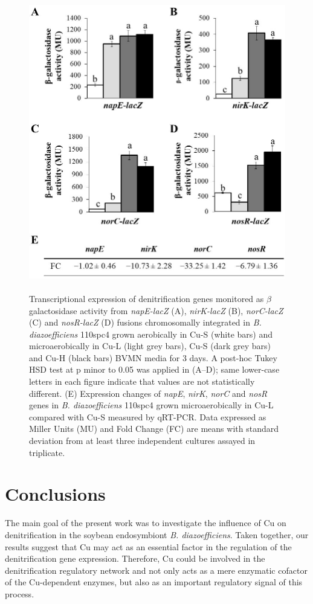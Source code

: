 \documentclass[12pt]{article}
\begin{document}
\begin{figure}[h!]
\centering
\includegraphics[height=13cm]{Images/Figure2 (2).jpg}
\caption{Transcriptional expression of denitrification genes monitored as $\beta$galactosidase activity
from {\em napE-lacZ} (A), {\em nirK-lacZ} (B), {\em norC-lacZ} (C) and {\em nosR-lacZ} (D) fusions chromosomally integrated
in {\em B. diazoefficiens} 110spc4 grown aerobically in Cu-S (white bars) and microaerobically in Cu-L (light
grey bars), Cu-S (dark grey bars) and Cu-H (black bars) BVMN media for 3 days. A post-hoc Tukey
HSD test at p minor to 0.05 was applied in (A–D); same lower-case letters in each figure indicate that
values are not statistically different. (E) Expression changes of {\em napE}, {\em nirK}, {\em norC} and {\em nosR} genes in
{\em B. diazoefficiens} 110spc4 grown microaerobically in Cu-L compared with Cu-S measured by qRT-PCR.
Data expressed as Miller Units (MU) and Fold Change (FC) are means with standard deviation from
at least three independent cultures assayed in triplicate.}
\end{figure}

\section{Conclusions}
The main goal of the present work was to investigate the influence of Cu on denitrification
in the soybean endosymbiont {\em B. diazoefficiens}. Taken together, our results suggest that
Cu may
act as an essential factor in the regulation of the denitrification gene expression. Therefore, Cu could be involved in the denitrification regulatory network and
not only acts as a mere enzymatic cofactor of the Cu-dependent enzymes, but also as an
important regulatory signal of this process.



\end{document}
